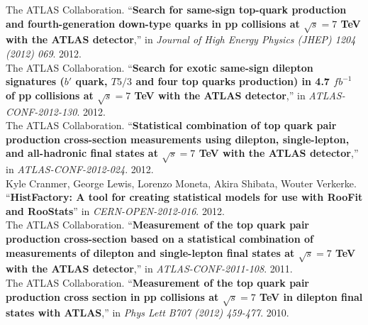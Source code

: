 \documentclass[9pt]{article}
\newenvironment{changemargin}[2]{%
  \begin{list}{}{%
    \setlength{\topsep}{0pt}%
    \setlength{\leftmargin}{#1}%
    \setlength{\rightmargin}{#2}%
    \setlength{\listparindent}{\parindent}%
    \setlength{\itemindent}{\parindent}%
    \setlength{\parsep}{\parskip}%
  }%
  \item[]}{\end{list}
}
\newenvironment{body} {
	\vspace*{-16pt}
	\begin{changemargin}{-0.25in}{-0.5in}
  }	
	{\end{changemargin}
}
\begin{document}
\begin{body}
  \vspace{14pt}
  The ATLAS Collaboration. ``\textbf{Search for same-sign top-quark production and fourth-generation down-type quarks in pp collisions at $\sqrt{s}=7$ TeV with the ATLAS detector},'' in \emph{Journal of High Energy Physics (JHEP) 1204 (2012) 069}. 2012.\\
  \medskip
  The ATLAS Collaboration. ``\textbf{Search for exotic same-sign dilepton signatures ($b'$ quark, $T5/3$ and four top quarks production) in 4.7 $fb^{-1}$ of pp collisions at $\sqrt{s}=7$ TeV with the ATLAS detector},'' in \emph{ATLAS-CONF-2012-130}. 2012.\\
  \medskip
  The ATLAS Collaboration.  ``\textbf{Statistical combination of top quark pair production cross-section measurements using dilepton, single-lepton, and all-hadronic final states at $\sqrt{s}=7$ TeV with the ATLAS detector},'' in \emph{ATLAS-CONF-2012-024}. 2012. \\
  \medskip
  Kyle Cranmer, George Lewis, Lorenzo Moneta, Akira Shibata, Wouter Verkerke.  ``\textbf{HistFactory: A tool for creating statistical models for use with RooFit and RooStats}'' in \emph{CERN-OPEN-2012-016}. 2012. \\
  \medskip
  The ATLAS Collaboration.  ``\textbf{Measurement of the top quark pair production cross-section based on a statistical combination of measurements of dilepton and single-lepton final states at $\sqrt{s}=7$ TeV with the ATLAS detector},'' in \emph{ATLAS-CONF-2011-108}. 2011. \\
  \medskip
  The ATLAS Collaboration. ``\textbf{Measurement of the top quark pair production cross section in pp collisions at $\sqrt{s}=7$ TeV in dilepton final states with ATLAS},'' in \emph{Phys Lett B707 (2012) 459-477}. 2010.\\
\end{body}

\smallskip
\end{document}

